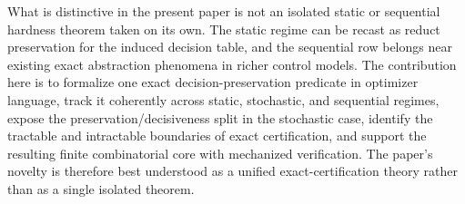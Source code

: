 What is distinctive in the present paper is not an isolated static or sequential hardness theorem taken on its own. The static regime can be recast as reduct preservation for the induced decision table, and the sequential row belongs near existing exact abstraction phenomena in richer control models. The contribution here is to formalize one exact decision-preservation predicate in optimizer language, track it coherently across static, stochastic, and sequential regimes, expose the preservation/decisiveness split in the stochastic case, identify the tractable and intractable boundaries of exact certification, and support the resulting finite combinatorial core with mechanized verification. The paper's novelty is therefore best understood as a unified exact-certification theory rather than as a single isolated theorem.
